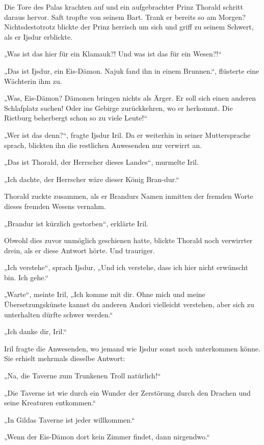 Die Tore des Palas krachten auf und ein aufgebrachter Prinz Thorald schritt daraus hervor. Saft tropfte von seinem Bart. Trank er bereits so am Morgen? Nichtsdestotrotz blickte der Prinz herrisch um sich und griff zu seinem Schwert, als er Ijsdur erblickte.

„Was ist das hier für ein Klamauk?! Und was ist das für ein Wesen?!“

„Das ist Ijsdur, ein Eis-Dämon. Najuk fand ihn in einem Brunnen.“, flüsterte eine Wächterin ihm zu.

„Was, Eis-Dämon? Dämonen bringen nichts als Ärger. Er soll sich einen anderen Schlafplatz suchen! Oder ins Gebirge zurückkehren, wo er herkommt. Die Rietburg beherbergt schon so zu viele Leute!“

„Wer ist das denn?“, fragte Ijsdur Iril. Da er weiterhin in seiner Muttersprache sprach, blickten ihn die restlichen Anwesenden nur verwirrt an.

„Das ist Thorald, der Herrscher dieses Landes“, murmelte Iril.

„Ich dachte, der Herrscher wäre dieser König Bran-dur.“

Thorald zuckte zusammen, als er Brandurs Namen inmitten der fremden Worte dieses fremden Wesens vernahm.

„Brandur ist kürzlich gestorben“, erklärte Iril.

Obwohl dies zuvor unmöglich geschienen hatte, blickte Thorald noch verwirrter drein, als er diese Antwort hörte. Und trauriger.

„Ich verstehe“, sprach Ijsdur, „Und ich verstehe, dass ich hier nicht erwünscht bin. Ich gehe.“

„Warte“, meinte Iril, „Ich komme mit dir. Ohne mich und meine Übersetzungskünste kannst du anderen Andori vielleicht verstehen, aber sich zu unterhalten dürfte schwer werden.“

„Ich danke dir, Iril.“

Iril fragte die Anwesenden, wo jemand wie Ijsdur sonst noch unterkommen könne. Sie erhielt mehrmals dieselbe Antwort:

„Na, die Taverne zum Trunkenen Troll natürlich!“

„Die Taverne ist wie durch ein Wunder der Zerstörung durch den Drachen und seine Kreaturen entkommen.“

„In Gildas Taverne ist jeder willkommen.“

„Wenn der Eis-Dämon dort kein Zimmer findet, dann nirgendwo.“



